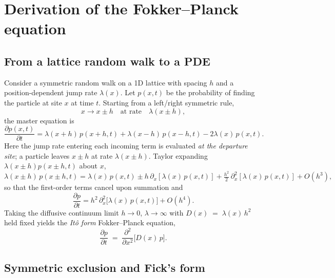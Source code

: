 
\section{Derivation of the Fokker--Planck equation}
\label{sec:derivation}

\subsection{From a lattice random walk to a PDE}

Consider a symmetric random walk on a 1D lattice with spacing $h$ and a
position-dependent jump rate $\lambda(x)$.  Let $p(x,t)$ be the probability of
finding the particle at site $x$ at time $t$.  Starting from a left/right
symmetric rule,
\[
x \longrightarrow x\pm h \quad\text{at rate}\quad \lambda(x\pm h),
\]
the master equation is
\begin{equation}
\frac{\partial p(x,t)}{\partial t}
= \lambda(x+h)\,p(x+h,t) + \lambda(x-h)\,p(x-h,t) - 2\lambda(x)\,p(x,t).
\label{eq:master}
\end{equation}
Here the jump rate entering each incoming term is evaluated \emph{at the
departure site}; a particle leaves $x\pm h$ at rate $\lambda(x\pm h)$.
Taylor expanding $\lambda(x\pm h)p(x\pm h,t)$ about $x$,
\[
\lambda(x\pm h)\,p(x\pm h,t)
= \lambda(x)\,p(x,t) \pm h\,\partial_x[\lambda(x)\,p(x,t)]
+ \tfrac{h^2}{2}\,\partial_x^2[\lambda(x)\,p(x,t)] + O(h^3),
\]
so that the first-order terms cancel upon summation and\\[-.5ex]
\begin{equation}
\frac{\partial p}{\partial t}
= h^2\,\partial_x^2\!\bigl[\lambda(x)\,p(x,t)\bigr] + O(h^4).
\label{eq:nabla2lp}
\end{equation}
Taking the diffusive continuum limit $h\to 0$, $\lambda\to\infty$ with
$D(x)\;=\;\lambda(x)\,h^2$ held fixed yields the \emph{It\^o form} Fokker--Planck
equation,
\begin{equation}
\frac{\partial p}{\partial t} \;=\; \frac{\partial^2}{\partial x^2}\bigl[D(x)\,p\bigr].
\label{eq:ito-fpe}
\end{equation}

\subsection{Symmetric exclusion and Fick's form}

